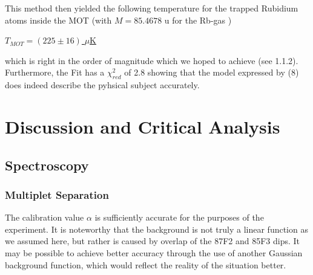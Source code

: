 \documentclass[12pt, a4paper]{article}
\begin{document}
\bigskip
This method then yielded the following temperature for the trapped Rubidium atoms inside the MOT (with $M=85.4678$ u for the Rb-gas \cite{Rbmass})

\bigskip
\underline{$T_{MOT}= (225 \pm 16)$ $\mu$K}

\bigskip
which is right in the order of magnitude which we hoped to achieve (see 1.1.2).
Furthermore, the Fit has a $\chi^2_{red}$ of 2.8 showing that the model expressed by (8) does indeed describe the pyhsical subject accurately.































\newpage

\section{Discussion and Critical Analysis}

\subsection{Spectroscopy}
\subsubsection{Multiplet Separation}
The calibration value $\alpha$ is sufficiently accurate for the purposes of the experiment. It is noteworthy that the background is not truly a linear function as we assumed here, but rather is caused by overlap of the 87F2 and 85F3 dips. It may be possible to achieve better accuracy through the use of another Gaussian background function, which would reflect the reality of the situation better.
\end{document}

